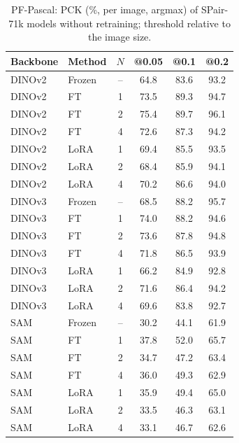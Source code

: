 \begin{table}[t]
\centering
\caption{PF-Pascal: PCK (\%, per image, argmax) of SPair-71k models without retraining; threshold relative to the image size.}
\label{tab:pf_pascal}
\small
\begin{tabular}{llcccc}
\toprule
Backbone & Method & $N$ & @0.05 & @0.1 & @0.2 \\
\midrule
DINOv2 & Frozen & -- & 64.8 & 83.6 & 93.2 \\
DINOv2 & FT & 1 & 73.5 & 89.3 & 94.7 \\
DINOv2 & FT & 2 & 75.4 & 89.7 & 96.1 \\
DINOv2 & FT & 4 & 72.6 & 87.3 & 94.2 \\
DINOv2 & LoRA & 1 & 69.4 & 85.5 & 93.5 \\
DINOv2 & LoRA & 2 & 68.4 & 85.9 & 94.1 \\
DINOv2 & LoRA & 4 & 70.2 & 86.6 & 94.0 \\
\midrule
DINOv3 & Frozen & -- & 68.5 & 88.2 & 95.7 \\
DINOv3 & FT & 1 & 74.0 & 88.2 & 94.6 \\
DINOv3 & FT & 2 & 73.6 & 87.8 & 94.8 \\
DINOv3 & FT & 4 & 71.8 & 86.5 & 93.9 \\
DINOv3 & LoRA & 1 & 66.2 & 84.9 & 92.8 \\
DINOv3 & LoRA & 2 & 71.6 & 86.4 & 94.2 \\
DINOv3 & LoRA & 4 & 69.6 & 83.8 & 92.7 \\
\midrule
SAM & Frozen & -- & 30.2 & 44.1 & 61.9 \\
SAM & FT & 1 & 37.8 & 52.0 & 65.7 \\
SAM & FT & 2 & 34.7 & 47.2 & 63.4 \\
SAM & FT & 4 & 36.0 & 49.3 & 62.9 \\
SAM & LoRA & 1 & 35.9 & 49.4 & 65.0 \\
SAM & LoRA & 2 & 33.5 & 46.3 & 63.1 \\
SAM & LoRA & 4 & 33.1 & 46.7 & 62.6 \\
\bottomrule
\end{tabular}
\end{table}
